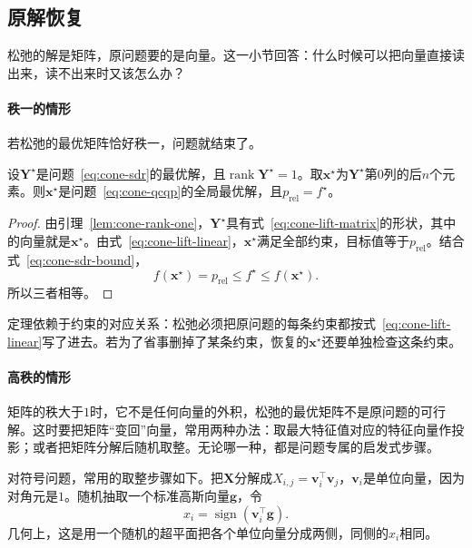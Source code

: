 \subsection{原解恢复}
\label{sec:cone-relax-recovery}

松弛的解是矩阵，原问题要的是向量。这一小节回答：什么时候可以把向量直接读出来，读不出来时又该怎么办？

\paragraph{秩一的情形}
若松弛的最优矩阵恰好秩一，问题就结束了。

\begin{theorem}[秩一解恢复原问题的最优解]
\label{thm:cone-rank-one-exact}
设$\bm{Y}^\star$是问题~\eqref{eq:cone-sdr}的最优解，且$\operatorname{rank}\bm{Y}^\star=1$。取$\bm{x}^\star$为$\bm{Y}^\star$第$0$列的后$n$个元素。则$\bm{x}^\star$是问题~\eqref{eq:cone-qcqp}的全局最优解，且$p_{\mathrm{rel}}=f^\star$。
\end{theorem}

\begin{proof}
由引理~\ref{lem:cone-rank-one}，$\bm{Y}^\star$具有式~\eqref{eq:cone-lift-matrix}的形状，其中的向量就是$\bm{x}^\star$。由式~\eqref{eq:cone-lift-linear}，$\bm{x}^\star$满足全部约束，目标值等于$p_{\mathrm{rel}}$。结合式~\eqref{eq:cone-sdr-bound}，
\[
 f(\bm{x}^\star)=p_{\mathrm{rel}}\leq f^\star\leq f(\bm{x}^\star).
\]
所以三者相等。
\end{proof}

定理依赖于约束的对应关系：松弛必须把原问题的每条约束都按式~\eqref{eq:cone-lift-linear}写了进去。若为了省事删掉了某条约束，恢复的$\bm{x}^\star$还要单独检查这条约束。

\paragraph{高秩的情形}
矩阵的秩大于$1$时，它不是任何向量的外积，松弛的最优矩阵不是原问题的可行解。这时要把矩阵“变回”向量，常用两种办法：取最大特征值对应的特征向量作投影；或者把矩阵分解后随机取整。无论哪一种，都是问题专属的启发式步骤。

对符号问题，常用的取整步骤如下。把$\bm{X}$分解成$X_{i,j}=\bm{v}_i^\top\bm{v}_j$，$\bm{v}_i$是单位向量，因为对角元是$1$。随机抽取一个标准高斯向量$\bm{g}$，令
\begin{equation}
 x_i=\operatorname{sign}(\bm{v}_i^\top\bm{g}).
 \label{eq:cone-rounding}
\end{equation}
几何上，这是用一个随机的超平面把各个单位向量分成两侧，同侧的$x_i$相同。

